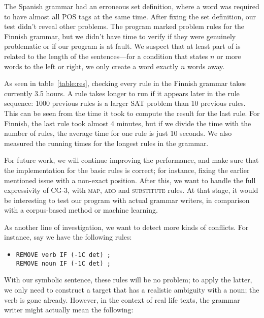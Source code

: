 The Spanish grammar had an erroneous set definition, where a word was required to have almost all POS tags at the same time. After fixing the set definition, our test didn't reveal other problems.
The program marked  problem rules for the Finnish grammar, but we didn't have time to verify if they were genuinely problematic or if our program is at fault.
We suspect that at least part of is related to the length of the sentences---for a condition that states $n$ or more words to the left or right, we only create a word exactly $n$ words away.

As seen in table~\ref{table:res}, checking every rule in the Finnish grammar takes currently 3.5 hours.
A rule takes longer to run if it appears later in the rule sequence: 1000 previous rules is a larger SAT problem than 10 previous rules.
This can be seen from the time it took to compute the result for the last rule. For Finnish, the last rule took almost 4 minutes, but if we divide the time with the number of rules, the average time for one rule is just 10 seconds.
We also measured the running times for the longest rules in the grammar.


For future work, we will continue improving the performance, and make sure that the implementation for the basic rules is correct; for instance, fixing the earlier mentioned issue with a non-exact position.
After this, we want to handle the full expressivity of CG-3, with \textsc{map}, \textsc{add} and \textsc{substitute} rules.
At that stage, it would be interesting to test our program with actual grammar writers,
in comparison with a corpus-based method or machine learning.

As another line of investigation, we want to detect more kinds of conflicts.
For instance, say we have the following rules:

\begin{itemize}
\item[] \begin{verbatim}
REMOVE verb IF (-1C det) ;
REMOVE noun IF (-1C det) ;
\end{verbatim}
\end{itemize}

With our symbolic sentence, these rules will be no problem; to apply the latter, we only need to construct a target that has a realistic ambiguity with a noun; the verb is gone already.
However, in the context of real life texts, the grammar writer might actually mean the following:

